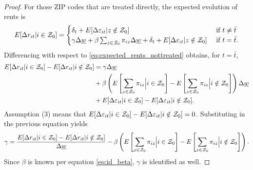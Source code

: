 \begin{proof}
    For those ZIP codes that are treated directly, the expected evolution of 
    rents is
    \begin{equation*}\label{eq:expected_rents_treated}
        E[\Delta r_{it} | i\in\mathcal{Z}_0] = 
        \begin{cases}
            \delta_t + E[\Delta \varepsilon_{it} | z\notin\mathcal{Z}_0] 
                                       & \text{ if } t\neq\bar{t} \\
            \gamma\Delta\underline{w} + \beta\sum_{z\in\mathcal{Z}_0}\pi_{iz}\Delta\underline{w} + \delta_t 
                     + E[\Delta \varepsilon_{it} | z\notin\mathcal{Z}_0] 
                                       & \text{ if } t=\bar{t} .
        \end{cases}
    \end{equation*}
    Differencing with respect to \ref{eq:expected_rents_nottreated} obtains, 
    for $t=\bar{t}$,
    \begin{equation*}
        \begin{split}
            E[\Delta r_{it} | i\in\mathcal{Z}_0] - E[\Delta r_{it} | i\notin\mathcal{Z}_0] 
              & = \gamma \Delta \underline{w}  \\
              & + \beta \left(E\left[\sum_{z\in\mathcal{Z}_0}\pi_{iz} \Big| i\in\mathcal{Z}_0\right]
                           - E\left[\sum_{z\in\mathcal{Z}_0}\pi_{iz} \Big| i\notin\mathcal{Z}_0\right]\right) \Delta \underline{w}  \\
              & + E[\Delta \varepsilon_{it} | i\in\mathcal{Z}_0] - E[\Delta \varepsilon_{it} | i\notin\mathcal{Z}_0] .
        \end{split}
    \end{equation*}
    Assumption (3) means that
    $E[\Delta \varepsilon_{it} | i\in\mathcal{Z}_0] 
      - E[\Delta \varepsilon_{it} | i\notin\mathcal{Z}_0] = 0$.
    Substituting in the previous equation yields
    \begin{equation}\label{eq:id_gamma}
        \gamma = \frac{E[\Delta r_{it} | i\in\mathcal{Z}_0] - E[\Delta r_{it} | i\notin\mathcal{Z}_0]}{\Delta\underline{w}}
            - \beta \left(E\left[\sum_{z\in\mathcal{Z}_0}\pi_{iz} \Big| i\in\mathcal{Z}_0   \right] 
                        - E\left[\sum_{z\in\mathcal{Z}_0}\pi_{iz} \Big| i\notin\mathcal{Z}_0\right]\right) .
    \end{equation}
    Since $\beta$ is known per equation \ref{eq:id_beta}, $\gamma$ is identified
    as well.
\end{proof}

